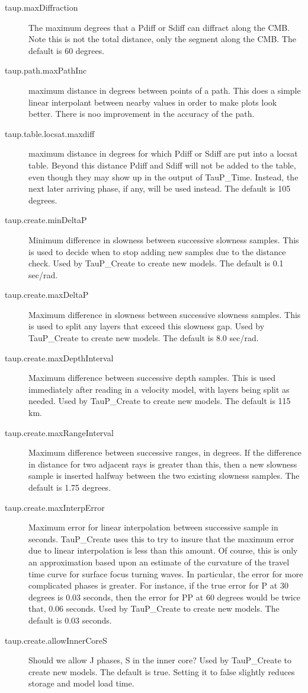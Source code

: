 \begin{description}
\item[taup.maxDiffraction] The maximum degrees that a Pdiff or Sdiff can diffract along the CMB.
 Note this is not the total distance, only the segment along the CMB. The default is 60 degrees.
\item[taup.path.maxPathInc] maximum distance in degrees between points of a path. This does a simple linear interpolant between nearby values in order to make plots look better. There is noo improvement in the accuracy of the path.
\item[taup.table.locsat.maxdiff] maximum distance in degrees for which Pdiff 
or Sdiff are put into a locsat table. Beyond this distance Pdiff and Sdiff will 
not be added to the table, even though they may show up in the output of 
TauP\_Time. Instead, the next later arriving phase, if any, will be used 
instead. The default is 105 degrees.
\item[taup.create.minDeltaP] Minimum difference in slowness between 
successive slowness samples. This is used to decide when to stop adding new 
samples due to the distance check.
Used by TauP\_Create to create new models. 
The default is 0.1 sec/rad. 
\item[taup.create.maxDeltaP] Maximum difference in slowness between 
successive slowness samples. This is used to split any layers that exceed
this slowness gap.
Used by TauP\_Create to create new models. 
 The default is 8.0 sec/rad. 
\item[taup.create.maxDepthInterval] Maximum difference between successive depth 
samples. This is used immediately after reading in a velocity model, with
layers being split as needed.
Used by TauP\_Create to create new models. 
 The default is 115 km. 
\item[taup.create.maxRangeInterval] Maximum difference between successive 
ranges, in degrees. If the difference in distance for two adjacent rays
is greater than this, then a new slowness sample is inserted halfway between
the two existing slowness samples.
The default is 1.75 degrees.
\item[taup.create.maxInterpError] Maximum error for linear interpolation
 between successive sample in seconds. TauP\_Create uses this to try to insure
that the maximum error due to linear interpolation is less than this amount.
Of course, this is only an approximation based upon an estimate of the
 curvature of the travel time curve for surface focus turning waves. 
In particular, the error for more complicated phases is greater. For instance,
if the true error for P at 30 degrees is 0.03 seconds, then the error for
PP at 60 degrees would be twice that, 0.06 seconds.
Used by TauP\_Create to create new models. The default is 0.03 seconds.
\item[taup.create.allowInnerCoreS] Should we allow J phases, S in 
the inner core?
Used by TauP\_Create to create new models. 
 The default is true. Setting it to false slightly reduces storage and model 
load time.
\end{description}

